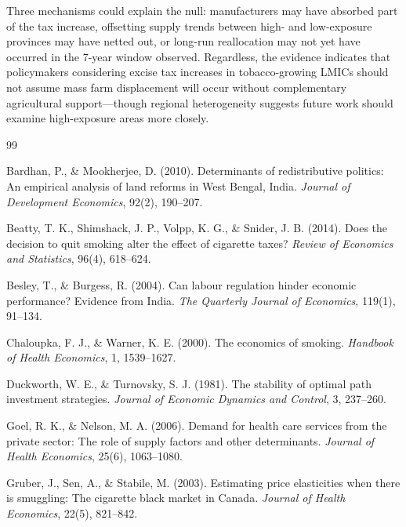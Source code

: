 \documentclass[12pt]{article}
\begin{document}
Three mechanisms could explain the null: manufacturers may have absorbed part of the tax increase, offsetting supply trends between high- and low-exposure provinces may have netted out, or long-run reallocation may not yet have occurred in the 7-year window observed. Regardless, the evidence indicates that policymakers considering excise tax increases in tobacco-growing LMICs should not assume mass farm displacement will occur without complementary agricultural support---though regional heterogeneity suggests future work should examine high-exposure areas more closely.



\clearpage
\newpage


\begin{thebibliography}{99}

Bardhan, P., \& Mookherjee, D. (2010). Determinants of redistributive politics: An empirical analysis of land reforms in West Bengal, India. \textit{Journal of Development Economics}, 92(2), 190--207.

Beatty, T. K., Shimshack, J. P., Volpp, K. G., \& Snider, J. B. (2014). Does the decision to quit smoking alter the effect of cigarette taxes? \textit{Review of Economics and Statistics}, 96(4), 618--624.

Besley, T., \& Burgess, R. (2004). Can labour regulation hinder economic performance? Evidence from India. \textit{The Quarterly Journal of Economics}, 119(1), 91--134.

Chaloupka, F. J., \& Warner, K. E. (2000). The economics of smoking. \textit{Handbook of Health Economics}, 1, 1539--1627.

Duckworth, W. E., \& Turnovsky, S. J. (1981). The stability of optimal path investment strategies. \textit{Journal of Economic Dynamics and Control}, 3, 237--260.

Goel, R. K., \& Nelson, M. A. (2006). Demand for health care services from the private sector: The role of supply factors and other determinants. \textit{Journal of Health Economics}, 25(6), 1063--1080.

Gruber, J., Sen, A., \& Stabile, M. (2003). Estimating price elasticities when there is smuggling: The cigarette black market in Canada. \textit{Journal of Health Economics}, 22(5), 821--842.


\end{thebibliography}
\end{document}

